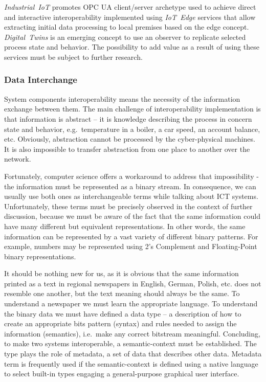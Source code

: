 \documentclass{jacsart}
\begin{document}
\textit{Industrial\ IoT} promotes OPC UA client/server archetype used to
achieve direct and interactive interoperability implemented using
\textit{IoT\ Edge} services that allow extracting initial data
processing to local premises based on the edge concept.
\textit{Digital\ Twins} is an emerging concept to use an observer to
replicate selected process state and behavior. The possibility to add
value as a result of using these services must be subject to further
research.

\subsubsection{Data Interchange}\label{data-interchange}

System components interoperability means the necessity of the
information exchange between them. The main challenge of
interoperability implementation is that information is abstract -- it is
knowledge describing the process in concern state and behavior,
e.g.~temperature in a boiler, a car speed, an account balance, etc.
Obviously, abstraction cannot be processed by the cyber-physical
machines. It is also impossible to transfer abstraction from one place
to another over the network.

Fortunately, computer science offers a workaround to address that
impossibility - the information must be represented as a binary stream.
In consequence, we can usually use both ones as interchangeable terms
while talking about ICT systems. Unfortunately, these terms must be
precisely observed in the context of further discussion, because we must
be aware of the fact that the same information could have many different
but equivalent representations. In other words, the same information can
be represented by a vast variety of different binary patterns. For
example, numbers may be represented using 2's Complement and
Floating-Point binary representations.

It should be nothing new for us, as it is obvious that the same
information printed as a text in regional newspapers in English, German,
Polish, etc. does not resemble one another, but the text meaning should
always be the same. To understand a newspaper we must learn the
appropriate language. To understand the binary data we must have defined
a data type -- a description of how to create an appropriate bits
pattern (syntax) and rules needed to assign the information (semantics),
i.e.~make any correct bitstream meaningful. Concluding, to make two
systems interoperable, a semantic-context must be established. The type
plays the role of metadata, a set of data that describes other data.
Metadata term is frequently used if the semantic-context is defined
using a native language to select built-in types engaging a
general-purpose graphical user interface.
\end{document}
